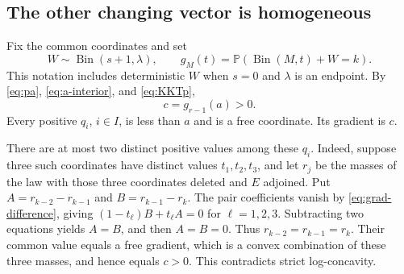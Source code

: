 \documentclass[11pt]{article}
\numberwithin{equation}{section}
\theoremstyle{remark}\newtheorem{remark}[theorem]{Remark}
\DeclareMathOperator{\Bin}{Bin}
\newcommand{\PP}{\mathbb P}
\begin{document}
\subsection{The other changing vector is homogeneous}
Fix the common coordinates and set
\[
 W\sim\Bin(s+1,\lambda),\qquad
 g_M(t)=\PP(\Bin(M,t)+W=k).
\]
This notation includes deterministic $W$ when $s=0$ and $\lambda$ is
an endpoint. By \eqref{eq:pa}, \eqref{eq:a-interior}, and
\eqref{eq:KKTp},
\begin{equation}\label{eq:ca}
 c=g_{r-1}(a)>0.
\end{equation}
Every positive $q_i$, $i\in I$, is less than $a$ and is a free coordinate.
Its gradient is $c$.

There are at most two distinct positive values among these $q_i$.
Indeed, suppose three such coordinates have distinct values
$t_1,t_2,t_3$, and let $r_j$ be the masses of the law with those three
coordinates deleted and $E$ adjoined. Put
$A=r_{k-2}-r_{k-1}$ and $B=r_{k-1}-r_k$.
The pair coefficients vanish by \eqref{eq:grad-difference}, giving
$(1-t_\ell)B+t_\ell A=0$ for $\ell=1,2,3$.
Subtracting two equations yields $A=B$, and then $A=B=0$.
Thus $r_{k-2}=r_{k-1}=r_k$. Their common value equals a free gradient,
which is a convex combination of these three masses, and hence equals
$c>0$. This contradicts strict log-concavity.
\end{document}
